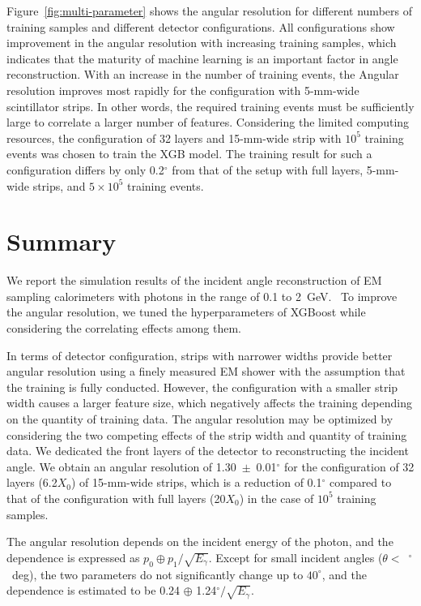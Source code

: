 \documentclass[preprint,12pt,times,a4paper]{elsarticle}
\begin{document}
Figure~\ref{fig:multi-parameter} shows the angular resolution for different numbers of training samples and different detector configurations. All configurations show improvement in the angular resolution with increasing training samples, which indicates that the maturity of machine learning is an important factor in angle reconstruction. With an increase in the number of training events, the Angular resolution improves most rapidly for the configuration with 5-mm-wide scintillator strips. In other words, the required training events must be sufficiently large to correlate a larger number of features. Considering the limited computing resources, the configuration of 32 layers and 15-mm-wide strip with $10^{5}$ training events was chosen to train the XGB model. The training result for such a configuration differs by only 0.2$^{\circ}$ from that of the setup with full layers, 5-mm-wide strips, and $5\times10^{5}$ training events.
 
\section{Summary}
\label{sec:sum}

We report the simulation results of the incident angle reconstruction of EM sampling calorimeters with photons in the range of 0.1 to 2~GeV. ~To improve the angular resolution, we tuned the hyperparameters of XGBoost while considering the correlating effects among them.

In terms of detector configuration, strips with narrower widths provide better angular resolution using a finely measured EM shower with the assumption that the training is fully conducted. However, the configuration with a smaller strip width causes a larger feature size, which negatively affects the training depending on the quantity of training data. The angular resolution may be optimized by considering the two competing effects of the strip width and quantity of training data. We dedicated the front layers of the detector to reconstructing the incident angle. We obtain an angular resolution of 1.30~$\pm$~0.01$^{\circ}$ for the configuration of 32 layers (6.2$X_{0}$) of 15-mm-wide strips, which is a reduction of 0.1$^{\circ}$ compared to that of the configuration with full layers (20$X_{0}$) in the case of $10^{5}$ training samples. 

The angular resolution depends on the incident energy of the photon, and the dependence is expressed as $p_{0} \oplus p_{1}/\sqrt{E_{\gamma}}$. Except for small incident angles ($\theta<$~$^{\circ}$~deg), the two parameters do not significantly change up to 
$40^{\circ}$, and the dependence is estimated to be 0.24 $\oplus$ 1.24$^{\circ}/\sqrt{E_{\gamma}}$. 
\end{document}
